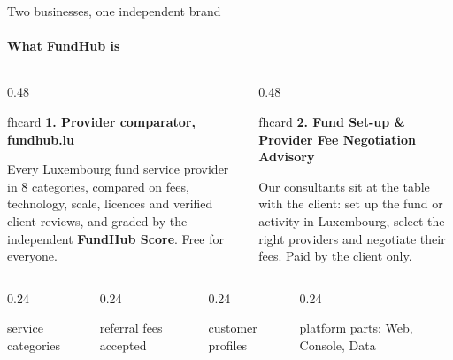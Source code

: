 \documentclass[aspectratio=169,10pt]{beamer}
\newcommand{\fhcard}[2]{%
  \begin{beamercolorbox}[wd=\linewidth,sep=7pt,rounded=true]{fhcard}
    {\small\bfseries\color{fhEmeraldDark}#1}\par\vspace{2pt}\footnotesize #2
  \end{beamercolorbox}}
\newcommand{\fhstat}[2]{{\fontsize{26}{28}\selectfont\bfseries\color{fhEmerald}#1}\par{\scriptsize\color{fhInkSoft}#2}}
\begin{document}
\begin{frame}{Two businesses, one independent brand}
  \framesubtitle{What FundHub is}
  \begin{columns}[T]
    \begin{column}{0.48\textwidth}
      \fhcard{1. Provider comparator, fundhub.lu}{Every Luxembourg fund service provider in 8 categories, compared on fees, technology, scale, licences and verified client reviews, and graded by the independent \textbf{FundHub Score}. Free for everyone.}
    \end{column}
    \begin{column}{0.48\textwidth}
      \fhcard{2. Fund Set-up \& Provider Fee Negotiation Advisory}{Our consultants sit at the table with the client: set up the fund or activity in Luxembourg, select the right providers and negotiate their fees. Paid by the client only.}
    \end{column}
  \end{columns}
  \vspace{5mm}
  \begin{columns}[T]
    \begin{column}{0.24\textwidth}\centering\fhstat{8}{service categories}\end{column}
    \begin{column}{0.24\textwidth}\centering\fhstat{0\,\euro}{referral fees accepted}\end{column}
    \begin{column}{0.24\textwidth}\centering\fhstat{2}{customer profiles}\end{column}
    \begin{column}{0.24\textwidth}\centering\fhstat{3}{platform parts: Web, Console, Data}\end{column}
  \end{columns}
\end{frame}
\end{document}
